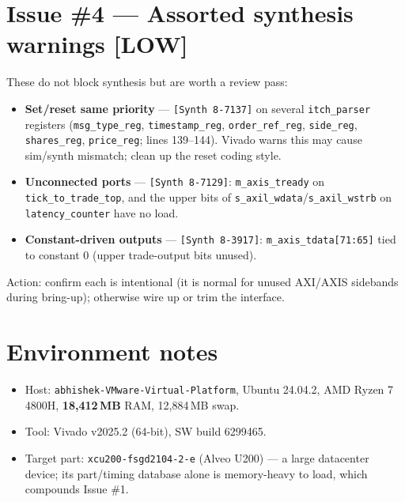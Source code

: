 \documentclass[11pt,a4paper]{article}
\newcommand{\sev}[1]{%
  \ifstrequal{#1}{HIGH}{\textcolor{sev-high}{\textbf{[HIGH]}}}{%
  \ifstrequal{#1}{MED}{\textcolor{sev-med}{\textbf{[MEDIUM]}}}{%
  \textcolor{sev-low}{\textbf{[LOW]}}}}}
\begin{document}
\section{Issue \#4 — Assorted synthesis warnings \sev{LOW}}

These do not block synthesis but are worth a review pass:

\begin{itemize}[leftmargin=*]
  \item \textbf{Set/reset same priority} — \texttt{[Synth 8-7137]} on several
        \texttt{itch\_parser} registers (\texttt{msg\_type\_reg},
        \texttt{timestamp\_reg}, \texttt{order\_ref\_reg}, \texttt{side\_reg},
        \texttt{shares\_reg}, \texttt{price\_reg}; lines 139--144). Vivado warns
        this may cause sim/synth mismatch; clean up the reset coding style.
  \item \textbf{Unconnected ports} — \texttt{[Synth 8-7129]}:
        \texttt{m\_axis\_tready} on \texttt{tick\_to\_trade\_top}, and the upper
        bits of \texttt{s\_axil\_wdata}/\texttt{s\_axil\_wstrb} on
        \texttt{latency\_counter} have no load.
  \item \textbf{Constant-driven outputs} — \texttt{[Synth 8-3917]}:
        \texttt{m\_axis\_tdata[71:65]} tied to constant 0 (upper trade-output
        bits unused).
\end{itemize}
Action: confirm each is intentional (it is normal for unused AXI/AXIS sidebands
during bring-up); otherwise wire up or trim the interface.

\section{Environment notes}
\begin{itemize}[leftmargin=*]
  \item Host: \texttt{abhishek-VMware-Virtual-Platform}, Ubuntu 24.04.2,
        AMD Ryzen 7 4800H, \textbf{18{,}412\,MB} RAM, 12{,}884\,MB swap.
  \item Tool: Vivado v2025.2 (64-bit), SW build 6299465.
  \item Target part: \texttt{xcu200-fsgd2104-2-e} (Alveo U200) — a large
        datacenter device; its part/timing database alone is memory-heavy to
        load, which compounds Issue \#1.
\end{itemize}
\end{document}
